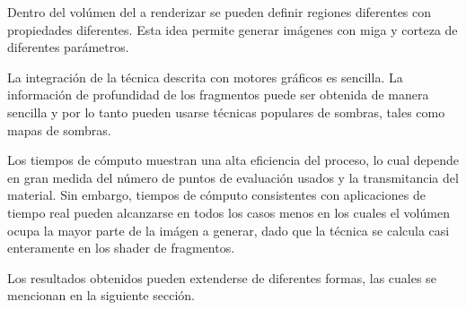 \documentclass[oneside,a4paper,spanish,links]{amca}
\begin{document}
Dentro del volúmen del a renderizar se pueden definir regiones
diferentes con propiedades diferentes. Esta idea permite generar
imágenes con miga y corteza de diferentes parámetros.

La integración de la técnica descrita con motores gráficos es
sencilla. La información de profundidad de los fragmentos puede ser
obtenida de manera sencilla y por lo tanto pueden usarse técnicas
populares de sombras, tales como mapas de sombras.

Los tiempos de cómputo muestran una alta eficiencia del proceso, lo
cual depende en gran medida del número de puntos de evaluación usados
y la transmitancia del material. Sin embargo, tiempos de cómputo
consistentes con aplicaciones de tiempo real pueden alcanzarse en
todos los casos menos en los cuales el volúmen ocupa la mayor parte de
la imágen a generar, dado que la técnica se calcula casi enteramente
en los shader de fragmentos. 

Los resultados obtenidos pueden extenderse de diferentes formas, las
cuales se mencionan en la siguiente sección.








\end{document}
